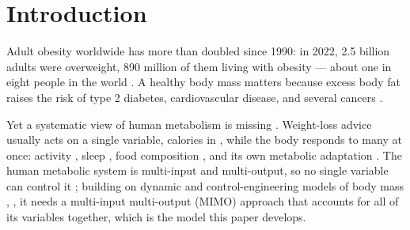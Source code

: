 \section{Introduction}

Adult obesity worldwide has more than doubled since 1990: in 2022, 2.5 billion adults were overweight, 890 million of them living with obesity — about one in eight people in the world \cite{ref_who2024}. A healthy body mass matters because excess body fat raises the risk of type 2 diabetes, cardiovascular disease, and several cancers \cite{ref_who2024}.

Yet a systematic view of human metabolism is missing \cite{ref_foresight2007}. Weight-loss advice usually acts on a single variable, calories in \cite{ref_hall2011}, while the body responds to many at once: activity \cite{ref_hall2012}, sleep \cite{ref_nedeltcheva2010}, food composition \cite{ref_hall2017}, and its own metabolic adaptation \cite{ref_fothergill2016}. The human metabolic system is multi-input and multi-output, so no single variable can control it \cite{ref_hall2022}; building on dynamic and control-engineering models of body mass \cite{ref_chow2008}, \cite{ref_navarro2011}, it needs a multi-input multi-output (MIMO) approach that accounts for all of its variables together, which is the model this paper develops.
